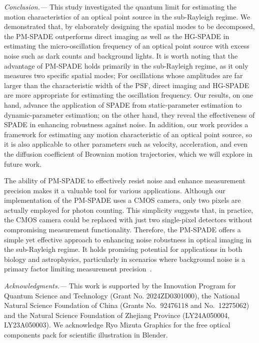 \documentclass[aps,pra,10pt,showpacs,amsmath,amssymb,floatfix,superscriptaddress,twocolumn]{revtex4-2}
\newcommand{\devnull}[3]{}
\begin{document}
\textit{Conclusion.---}
This study investigated the quantum limit for estimating the motion characteristics of an optical point source in the sub-Rayleigh regime.
We demonstrated that, by elaborately designing the spatial modes to be decomposed, the PM-SPADE outperforms direct imaging as well as the HG-SPADE in estimating the micro-oscillation frequency of an optical point source with excess noise such as dark counts and background lights.
It is worth noting that the advantage of PM-SPADE holds primarily in the sub-Rayleigh regime, as it only measures two specific spatial modes;
For oscillations whose amplitudes are far larger than the characteristic width of the PSF, direct imaging and HG-SPADE are more appropriate for estimating the oscillation frequency.
Our results, on one hand, advance the application of SPADE from static-parameter estimation to dynamic-parameter estimation; on the other hand, they reveal the effectiveness of SPADE in enhancing robustness against noise.
In addition, our work provides a framework for estimating any motion characteristic of an optical point source, so it is also applicable to other parameters such as velocity, acceleration, and even the diffusion coefficient of Brownian motion trajectories, which we will explore in future work.


The ability of PM-SPADE to effectively resist noise and enhance measurement precision makes it a valuable tool for various applications.
Although our implementation of the PM-SPADE uses a CMOS camera, only two pixels are actually employed for photon counting.
This simplicity suggests that, in practice, the CMOS camera could be replaced with just two single-pixel detectors without compromising measurement functionality.
Therefore, the PM-SPADE offers a simple yet effective approach to enhancing noise robustness in optical imaging in the sub-Rayleigh regime. 
It holds promising potential for applications in both biology and astrophysics, particularly in scenarios where background noise is a primary factor limiting measurement precision~\cite{Prusti2016,Moeckl2019}.


\begingroup
\let\addcontentsline\devnull

\textit{Acknowledgments.---}
This work is supported by the Innovation Program for Quantum Science and Technology (Grant No. 2024ZD0301000), the National Natural Science Foundation of China (Grants No.\ 92476118 and No.\ 12275062) and the Natural Science Foundation of Zhejiang Province (LY24A050004, LY23A050003).
We acknowledge Ryo Mizuta Graphics for the free optical components pack for scientific illustration in Blender.
\end{document}
